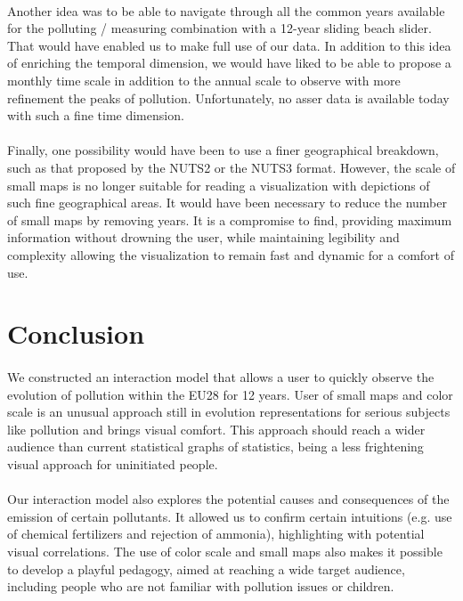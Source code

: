\documentclass[preprint,journal]{vgtc}       %
\begin{document}
\paragraph{}		
Another idea was to be able to navigate through all the common years available for the polluting / measuring combination with a 12-year sliding beach slider. That would have enabled us to make full use of our data. In addition to this idea of ​​enriching the temporal dimension, we would have liked to be able to propose a monthly time scale in addition to the annual scale to observe with more refinement the peaks of pollution. Unfortunately, no asser data is available today with such a fine time dimension.

\paragraph{}
Finally, one possibility would have been to use a finer geographical breakdown, such as that proposed by the NUTS2 or the NUTS3 format. However, the scale of small maps is no longer suitable for reading a visualization with depictions of such fine geographical areas. It would have been necessary to reduce the number of small maps by removing years. It is a compromise to find, providing maximum information without drowning the user, while maintaining legibility and complexity allowing the visualization to remain fast and dynamic for a comfort of use.

\section{Conclusion}

\paragraph{}
We constructed an interaction model that allows a user to quickly observe the evolution of pollution within the EU28 for 12 years. User of small maps and color scale is an unusual approach still in evolution representations for serious subjects like pollution and brings visual comfort. This approach should reach a wider audience than current statistical graphs of statistics, being a less frightening visual approach for uninitiated people.

\paragraph{}
Our interaction model also explores the potential causes and consequences of the emission of certain pollutants. It allowed us to confirm certain intuitions (e.g. use of chemical fertilizers and rejection of ammonia), highlighting with potential visual correlations. The use of color scale and small maps also makes it possible to develop a playful pedagogy, aimed at reaching a wide target audience, including people who are not familiar with pollution issues or children. 
\end{document}
